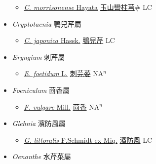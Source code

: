 \begin{itemize}
  \begin{itemize}
        \item[] \href{http://www.theplantlist.org/tpl1.1/search?q=Conioselinum+morrisonense}{\textit{C. morrisonense} Hayata}   \href{\detokenize{http://taibnet.sinica.edu.tw/chi/taibnet_species_list.php?T2=玉山彎柱芎&T2_new_value=true&fr=y}}{玉山彎柱芎}\# LC
  \end{itemize}
 \item[] \textit{Cryptotaenia} 鴨兒芹屬
                    
  \begin{itemize}
        \item[] \href{http://www.theplantlist.org/tpl1.1/search?q=Cryptotaenia+japonica}{\textit{C. japonica} Hassk.}   \href{\detokenize{http://taibnet.sinica.edu.tw/chi/taibnet_species_list.php?T2=鴨兒芹&T2_new_value=true&fr=y}}{鴨兒芹} LC
  \end{itemize}
 \item[] \textit{Eryngium} 刺芹屬
                    
  \begin{itemize}
        \item[] \href{http://www.theplantlist.org/tpl1.1/search?q=Eryngium+foetidum}{\textit{E. foetidum} L.}   \href{\detokenize{http://taibnet.sinica.edu.tw/chi/taibnet_species_list.php?T2=刺芫荽&T2_new_value=true&fr=y}}{刺芫荽} NA$^n$
  \end{itemize}
 \item[] \textit{Foeniculum} 茴香屬
                    
  \begin{itemize}
        \item[] \href{http://www.theplantlist.org/tpl1.1/search?q=Foeniculum+vulgare}{\textit{F. vulgare} Mill.}   \href{\detokenize{http://taibnet.sinica.edu.tw/chi/taibnet_species_list.php?T2=茴香&T2_new_value=true&fr=y}}{茴香} NA$^n$
  \end{itemize}
 \item[] \textit{Glehnia} 濱防風屬
                    
  \begin{itemize}
        \item[] \href{http://www.theplantlist.org/tpl1.1/search?q=Glehnia+littoralis}{\textit{G. littoralis} F.Schmidt ex Miq.}   \href{\detokenize{http://taibnet.sinica.edu.tw/chi/taibnet_species_list.php?T2=濱防風&T2_new_value=true&fr=y}}{濱防風} LC
  \end{itemize}
 \item[] \textit{Oenanthe} 水芹菜屬
                    

\end{itemize}
